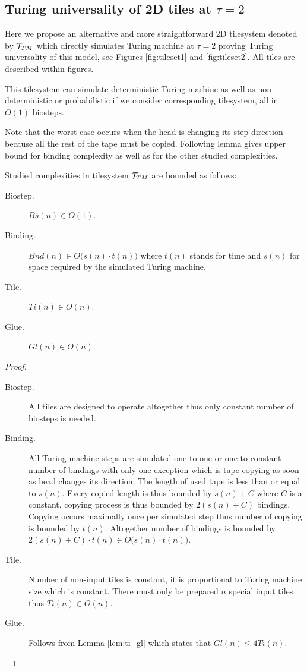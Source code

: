 \subsection{Turing universality of 2D tiles at $\tau=2$}
	
	Here we propose an alternative and more straightforward 2D tilesystem denoted by ${\cal T}_{TM}$ which directly simulates Turing machine at $\tau=2$ proving Turing universality of this model, see Figures \ref{fig:tileset1} and \ref{fig:tileset2}. All tiles are described within figures.
	\begin{remark}
		This tilesystem can simulate deterministic Turing machine as well as non-deter\-ministic or probabilistic if we consider corresponding tilesystem, all in $O(1)$ biosteps.
	\end{remark}
	Note that the worst case occurs when the head is changing its step direction because all the rest of the tape must be copied. Following lemma gives upper bound for binding complexity as well as for the other studied complexities.
	\begin{lemma}
	\label{lem:TM_bound}
		Studied complexities in tilesystem ${\cal T}_{TM}$ are bounded as follows:
		\begin{description}
			\item[Biostep.] $Bs(n) \in O(1)$.
			\item[Binding.] $Bnd(n) \in O\bigl(s(n)\cdot t(n)\bigr)$ where $t(n)$ stands for time and $s(n)$ for space required by the simulated Turing machine.
			\item[Tile.] $Ti(n) \in O(n)$.
			\item[Glue.] $Gl(n) \in O(n)$.
		\end{description}
	\end{lemma}
	\begin{proof}
		~
		\begin{description}
			\item[Biostep.] All tiles are designed to operate altogether thus only constant number of biosteps is needed.
			\item[Binding.] All Turing machine steps are simulated one-to-one or one-to-constant number of bindings with only one exception which is tape-copying as soon as head changes its direction. The length of %
			used tape is less than or equal to $s(n)$. Every copied length is thus bounded by $s(n) + C$ where $C$ is a constant, copying process is thus bounded by $2(s(n)+C)$ bindings. Copying occurs maximally once per simulated step thus number of copying is bounded by $t(n)$. Altogether number of bindings is bounded by $2(s(n)+C)\cdot t(n) \in O\bigl(s(n)\cdot t(n)\bigr)$.
			\item[Tile.] Number of non-input tiles is constant, it is proportional to Turing machine size which is constant. There must only be prepared $n$ special input tiles thus $Ti(n) \in O(n)$.
			\item[Glue.] Follows from Lemma \ref{lem:ti_gl} which states that $Gl(n) \leq 4Ti(n)$.
		\end{description}
	\end{proof}
